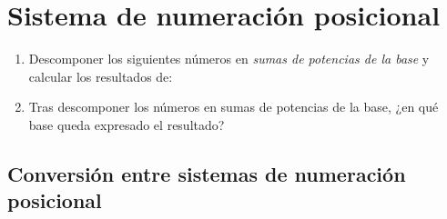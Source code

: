 \documentclass[12pt]{article}
\begin{document}
\section{Sistema de numeración posicional}

\begin{enumerate}[resume]

    \item Descomponer los siguientes números en \emph{sumas de potencias de la
        base} y calcular los resultados de:


    \item Tras descomponer los números en sumas de potencias de la base, ¿en
        qué base queda expresado el resultado?

\end{enumerate}

\subsection{Conversión entre sistemas de numeración posicional}
\end{document}
